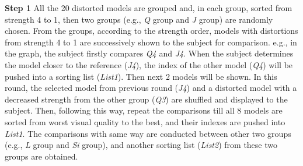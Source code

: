 \textbf{Step 1}  All the 20 distorted models are grouped and, in each group, sorted from strength 4 to 1, then two groups (e.g., \textit{Q} group and \textit{J} group) are randomly chosen. From the groups, according to the strength order, models with distortions from strength 4 to 1 are successively shown to the subject for comparison. e.g., in the graph, the subject firstly compares \textit{Q4} and \textit{J4}.  When the subject determines the model closer to the reference (\textit{J4}), the index of the other model (\textit{Q4}) will be pushed into a sorting list (\textit{List1}). Then next 2 models will be shown. In this round, the selected model from previous round (\textit{J4}) and a distorted model with a decreased strength from the other group (\textit{Q3}) are shuffled and displayed to the subject. Then, following this way, repeat the comparisons till all 8 models are sorted from worst visual quality to the best, and their indexes are pushed into \textit{List1}. The comparisons with same way are conducted between other two groups (e.g., \textit{L} group and \textit{Si} group), and another sorting list (\textit{List2}) from these two groups are obtained. 